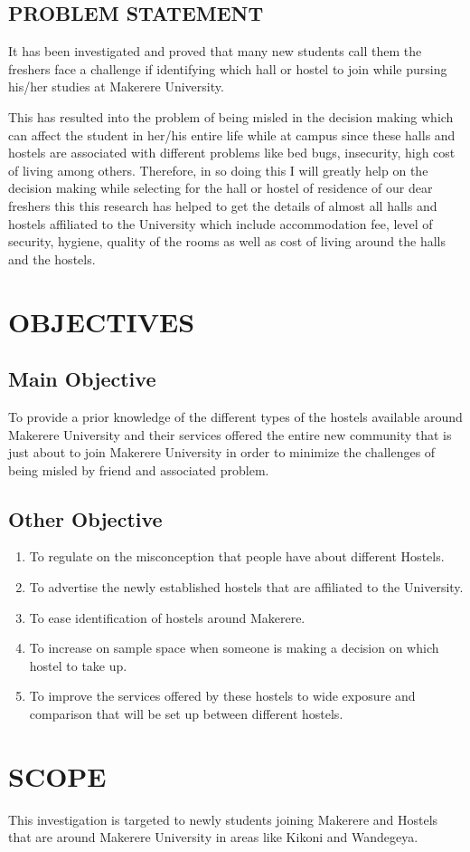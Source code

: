 \documentclass{article}
\begin{document}
\subsection{PROBLEM STATEMENT}\label{sec:into}
It has been investigated and proved that many new students call them the freshers face a challenge if identifying which hall or hostel to join while pursing his/her studies at Makerere University. 

This has resulted into the problem of being misled in the decision making which can affect the student in her/his entire life while at campus since these halls and hostels are associated with different problems like bed bugs, insecurity, high cost of living among others. Therefore, in so doing this I will greatly help on the decision making while selecting for the hall or hostel of residence of our dear freshers this this research has helped to get the details of almost all halls and hostels affiliated to the University which include accommodation fee, level of security, hygiene, quality of the rooms as well as cost of living around the halls and the hostels. 
 

\section{OBJECTIVES}\label{sec:into}

\subsection{Main Objective}\label{sec:into}
To provide a prior knowledge of the different types of the hostels available around Makerere University and   their services offered the entire new community that is just about to join Makerere University in order to minimize the challenges of being misled by friend and associated problem. 

\subsection{Other Objective}\label{sec:into}
\begin{enumerate}
	\item  To regulate on the misconception that people have about different Hostels.
	\item   To advertise the newly established hostels that are affiliated to the University. 
	\item  To ease identification of hostels around Makerere.
	\item    To increase on sample space when someone is making a decision on which hostel to take up.
	\item   To improve the services offered by these hostels to wide exposure and comparison that will be set up   between different hostels.
\end{enumerate}


\section{SCOPE}\label{sec:into}

This investigation is targeted to newly students joining Makerere and Hostels that are around Makerere University in areas like Kikoni and Wandegeya.
\end{document}
